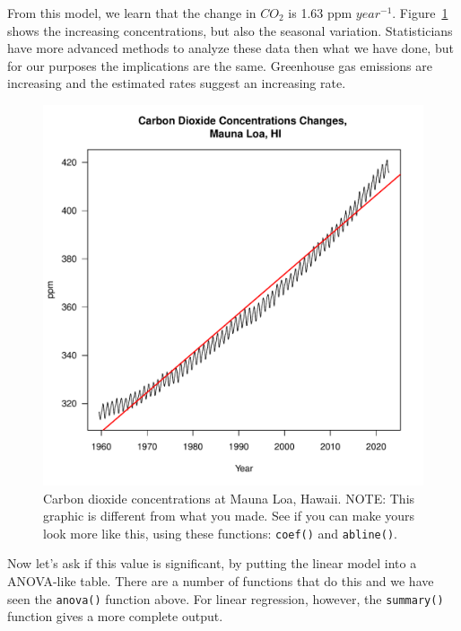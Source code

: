 \documentclass{tufte-handout}\usepackage[]{graphicx}\usepackage[]{xcolor}
\makeatletter
\def\maxwidth{ %
  \ifdim\Gin@nat@width>\linewidth
    \linewidth
  \else
    \Gin@nat@width
  \fi
}
\newenvironment{knitrout}{}{} %
\makeatother
\begin{document}
From this model, we learn that the change in $CO_2$ is 1.63 ppm $year^{-1}$. Figure~\ref{fig:maunaloa} shows the increasing concentrations, but also the seasonal variation. Statisticians have more advanced methods to analyze these data then what we have done, but for our purposes the implications are the same.  Greenhouse gas emissions are increasing and the estimated rates suggest an increasing rate.

\begin{figure}
\label{fig:maunaloa}
\caption{Carbon dioxide concentrations at Mauna Loa, Hawaii. NOTE: This graphic is different from what you made. See if you can make yours look more like this, using these functions: \texttt{coef()} and \texttt{abline()}.}
\begin{knitrout}
\color{fgcolor}
\includegraphics[width=\maxwidth]{figure/unnamed-chunk-54-1} 
\end{knitrout}
\end{figure}

Now let's ask if this value is significant, by putting the linear model into a ANOVA-like table. There are a number of functions that do this and we have seen the \texttt{anova()} function above. For linear regression, however, the \texttt{summary()} function gives a more complete output.
\end{document}
